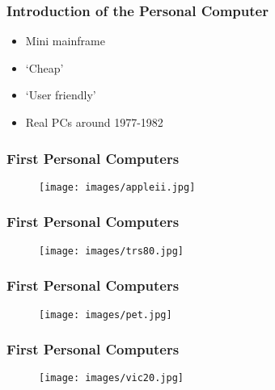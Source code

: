 \documentclass[aspectratio=43]{uva-inf-presentation}
\begin{document}

\begin{frame}
\frametitle{Introduction of the Personal Computer}

\begin{itemize}
\item Mini mainframe
\item `Cheap'
\item `User friendly'
\item Real PCs around 1977-1982
\end{itemize}

\end{frame}


\begin{frame}
\frametitle{First Personal Computers}

\begin{figure}
\texttt{[image: images/appleii.jpg]}
\end{figure}

\end{frame}


\begin{frame}
\frametitle{First Personal Computers}

\begin{figure}
\texttt{[image: images/trs80.jpg]}
\end{figure}

\end{frame}


\begin{frame}
\frametitle{First Personal Computers}

\begin{figure}
\texttt{[image: images/pet.jpg]}
\end{figure}

\end{frame}


\begin{frame}
\frametitle{First Personal Computers}

\begin{figure}
\texttt{[image: images/vic20.jpg]}
\end{figure}

\end{frame}
\end{document}
